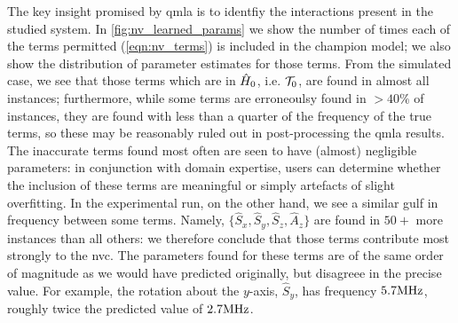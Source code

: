 The key insight promised by \gls{qmla} is to identfiy the interactions present in the studied system. 
In \cref{fig:nv_learned_params} we show the number of times each of the terms permitted (\cref{eqn:nv_terms})
    is included in the champion model; 
    we also show the distribution of parameter estimates for those terms. 
From the simulated case, we see that those terms which are in $\hat{H}_0$, i.e. ${ \mathcal{T} }_0$, are found in almost all instances; 
    furthermore, while some terms are erroneoulsy found in $>40\%$ of instances, 
    they are found with less than a quarter of the frequency of the true terms,
    so these may be reasonably ruled out in post-processing the \gls{qmla} results. 
The inaccurate terms found most often are seen to have (almost) negligible parameters:
    in conjunction with domain expertise, users can determine whether the inclusion of these terms 
    are meaningful or simply artefacts of slight overfitting.
In the experimental \gls{run}, on the other hand, we see a similar gulf in frequency between some terms.
Namely, $\{ \hat{S}_x, \hat{S}_y, \hat{S}_z, \hat{A}_z \}$ are found in $50+$ more instances than all others:
    we therefore conclude that those terms contribute most strongly to the \gls{nvc}.
The parameters found for these terms are of the same order of magnitude as we would have predicted originally, 
    but disagreee in the precise value. 
For example, the rotation about the $y$-axis, $\hat{S}_y$, has frequency $5.7\textrm{MHz}$, 
    roughly twice the predicted value of $2.7\textrm{MHz}$. 